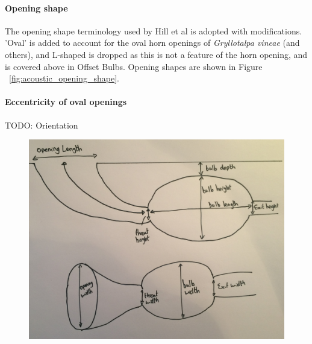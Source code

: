 \documentclass{article}
\begin{document}
   \paragraph{Opening shape}
   The opening shape terminology used by Hill et al \cite{hill2006} is adopted with modifications. 'Oval' is added to account for the oval horn openings of \textit{Gryllotalpa vineae} (and others), and L-shaped is dropped as this is not a feature of the horn opening, and is covered above in Offset Bulbs. Opening shapes are shown in Figure ~\ref{fig:acoustic_opening_shape}.
   \paragraph{Eccentricity of oval openings}
   TODO: Orientation
   \begin{figure}[h]
   	\includegraphics[width=\textwidth]{acoustic_measurements}
   	\caption{}
   	\label{fig:acoustic_measurements}
   \end{figure}
   
\end{document}
